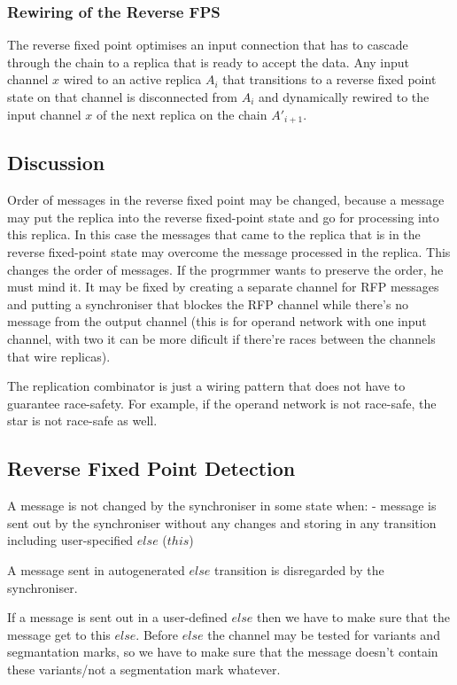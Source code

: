 \subsubsection{Rewiring of the Reverse FPS}
The reverse fixed point optimises an input connection that has to cascade through the chain to a replica that is ready to accept the data. Any input channel $x$ wired to an active replica $A_i$ that transitions to a reverse fixed point state on that channel is disconnected from $A_i$ and dynamically rewired to the input channel $x$ of the next replica on the chain $A'_{i+1}$.



    \subsection{Discussion}
Order of messages in the reverse fixed point may be changed, because a message may put the replica into the reverse fixed-point state and go for processing into this replica. In this case the messages that came to the replica that is in the reverse fixed-point state may overcome the message processed in the replica. This changes the order of messages. If the progrmmer wants to preserve the order, he must mind it. It may be fixed by creating a separate channel for RFP messages and putting a synchroniser that blockes the RFP channel while there's no message from the output channel (this is for operand network with one input channel, with two it can be more dificult if there're races between the channels that wire replicas).

The replication combinator is just a wiring pattern that does not have to guarantee race-safety. For example, if the operand network is not race-safe, the star is not race-safe as well.


    \subsection{Reverse Fixed Point Detection\label{rfp_detect}}
A message is not changed by the synchroniser in some state when:
- message is sent out by the synchroniser without any changes and storing in any transition including user-specified $else$ ($this$)

A message sent in autogenerated $else$ transition is disregarded by the synchroniser.

If a message is sent out in a user-defined $else$ then we have to make sure that the message get to this $else$. Before $else$ the channel may be tested for variants and segmantation marks, so we have to make sure that the message doesn't contain these variants/not a segmentation mark whatever.


